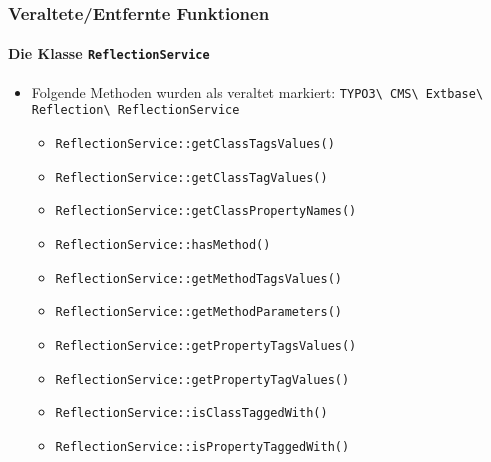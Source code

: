 
\begin{frame}[fragile]
	\frametitle{Veraltete/Entfernte Funktionen}
	\framesubtitle{Die Klasse \texttt{ReflectionService}}

	\begin{itemize}
		\item Folgende Methoden wurden als veraltet markiert:\newline
			\smaller\texttt{TYPO3\textbackslash
				CMS\textbackslash
				Extbase\textbackslash
				Reflection\textbackslash
				ReflectionService}\normalsize

				\begin{itemize}\smaller
					\item \texttt{ReflectionService::getClassTagsValues()}
					\item \texttt{ReflectionService::getClassTagValues()}
					\item \texttt{ReflectionService::getClassPropertyNames()}
					\item \texttt{ReflectionService::hasMethod()}
					\item \texttt{ReflectionService::getMethodTagsValues()}
					\item \texttt{ReflectionService::getMethodParameters()}
					\item \texttt{ReflectionService::getPropertyTagsValues()}
					\item \texttt{ReflectionService::getPropertyTagValues()}
					\item \texttt{ReflectionService::isClassTaggedWith()}
					\item \texttt{ReflectionService::isPropertyTaggedWith()}
				\end{itemize}

	\end{itemize}

\end{frame}



